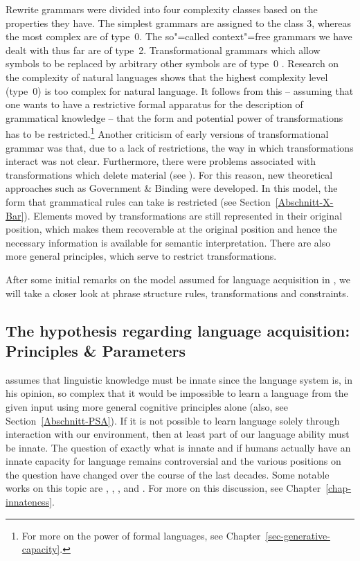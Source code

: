 Rewrite grammars were divided into four complexity classes based on the properties they
have. The simplest grammars are assigned to the class 3, whereas the most complex are of type~0. The so"=called 
context"=free grammars we have dealt with thus far are of type~2. Transformational grammars which allow symbols to
be replaced by arbitrary other symbols are of type~0 \citep{PR73a-u}.\label{page-TG-Typ0} Research on the complexity
of natural languages shows that the highest complexity level (type~0) is too complex for natural language. It follows from this
-- assuming that one wants to have a restrictive formal apparatus for the description of grammatical knowledge \citep[]{Chomsky65a} -- that
the form and potential power of transformations has to be restricted.\footnote{
	For more on the power of formal languages, see Chapter~\ref{sec-generative-capacity}.
} 
Another criticism of early versions of transformational grammar was that, due to a lack of restrictions, the way in which transformations interact was not clear. 
Furthermore, there were problems associated with transformations which delete material (see
\citealp[Section~3.1.4]{Klenk2003a}). For this reason, new theoretical approaches such 
as Government \& Binding \citep{Chomsky81a} were developed. In this model, the form that grammatical rules can take is restricted (see Section~\ref{Abschnitt-X-Bar}). Elements
moved by transformations are still represented in their original position, which makes them
recoverable at the original position and hence the necessary information is available for semantic interpretation. 
There are also more general principles, which serve to restrict transformations.

After some initial remarks on the model assumed for language acquisition in \gbt, we will take a closer look at phrase structure rules,
transformations and constraints.


\subsection{The hypothesis regarding language acquisition: Principles \& Parameters}
\label{Abschnitt-GB-Paramater}

\citet[Section~I.8]{Chomsky65a} assumes that linguistic knowledge must be innate since the language system is,
in his opinion, so complex that it would be impossible to learn a language from the given input using more general cognitive principles alone
(also, see Section~\ref{Abschnitt-PSA}). If it is not possible to learn language solely through interaction with our environment, then at least part of
our language ability must be innate. The question of exactly what is innate and if humans actually have an innate capacity for language remains
controversial and the various positions on the question have changed over the course of the last decades. Some notable works on this topic are , 
, ,  and . For more on this discussion, see Chapter~\ref{chap-innateness}.

